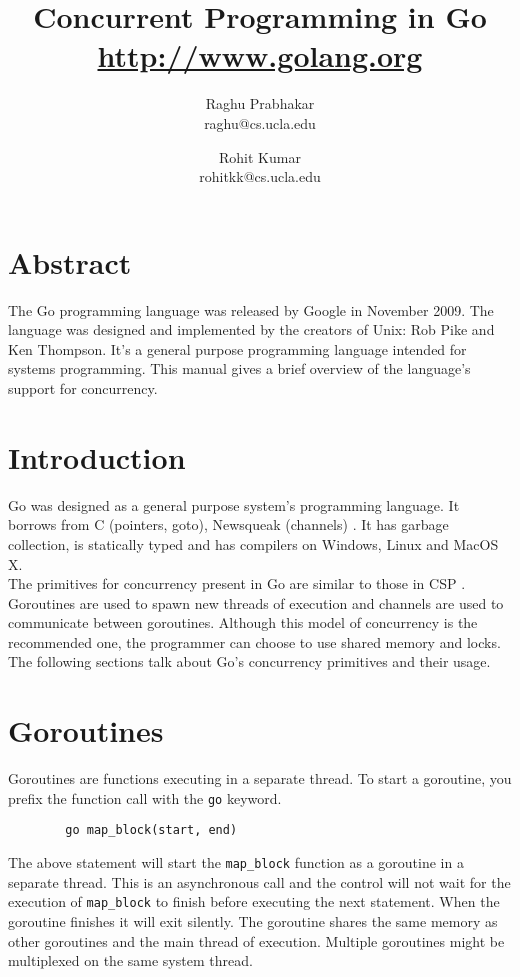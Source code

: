 \documentclass[8pt, twocolumn]{article}
\title{Concurrent Programming in Go \\
\small{\url{http://www.golang.org}}
}
\author{
  Raghu Prabhakar
  \\\small{raghu@cs.ucla.edu}
  \and 
  Rohit Kumar 
  \\\small{rohitkk@cs.ucla.edu}
}
\begin{document}
\maketitle
\section{Abstract}
The Go programming language was released by Google in November
2009. The language was designed and implemented by the creators of
Unix: Rob Pike and Ken Thompson. It's a general purpose programming
language intended for systems programming. This manual gives a brief
overview of the language's support for concurrency.\\
\section{Introduction}
Go was designed as a general purpose system's programming language. It
borrows from C (pointers, goto), Newsqueak (channels) \cite{gofaq}. It
has garbage collection, is statically typed and has compilers on
Windows, Linux and MacOS X.\\

The primitives for concurrency present in Go are similar to those
in CSP \cite{goblog}. Goroutines are used to spawn new threads of
execution and channels are used to communicate between
goroutines. Although this model of concurrency is the recommended one,
the programmer can choose to use shared memory and locks. The
following sections talk about Go's concurrency primitives and their
usage.

\section{Goroutines}
Goroutines are functions executing in a separate thread. To start a
goroutine, you prefix the function call with the \verb=go= keyword.
\begin{verbatim}
        go map_block(start, end)
\end{verbatim}
The above statement will start the \verb=map_block= function as a
goroutine in a separate thread. This is an asynchronous call and the
control will not wait for the execution of \verb=map_block= to finish
before executing the next statement. When the goroutine finishes it will
exit silently. The goroutine shares the same memory
as other goroutines and the main thread of execution. Multiple
goroutines might be multiplexed on the same system thread.\\
\end{document}
